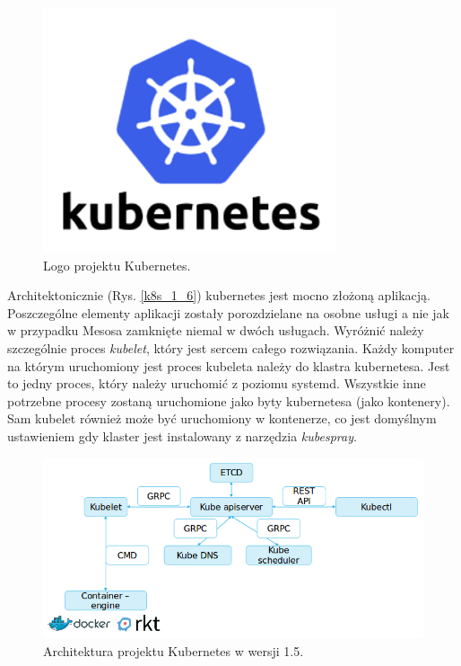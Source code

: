 \documentclass[10pt,a4paper,titlepage,twoside]{report}
\begin{document}
\begin{figure}[!h]
	\centering
	\includegraphics[scale=1]{pics/Kubernetes-logo.png}
	\caption{Logo projektu Kubernetes.}
	\label{kube_logo}
\end{figure}

Architektonicznie (Rys. \ref{k8s_1_6}) kubernetes jest mocno złożoną aplikacją. Poszczególne elementy aplikacji zostały porozdzielane na osobne usługi a nie jak w przypadku Mesosa zamknięte niemal w dwóch usługach. Wyróżnić należy szczególnie proces \textit{kubelet}, który jest sercem całego rozwiązania. Każdy komputer na którym uruchomiony jest proces kubeleta należy do klastra kubernetesa. Jest to jedny proces, który należy uruchomić z poziomu systemd. Wszystkie inne potrzebne procesy zostaną uruchomione jako byty kubernetesa (jako kontenery). Sam kubelet również może być uruchomiony w kontenerze, co jest domyślnym ustawieniem gdy klaster jest instalowany z narzędzia \textit{kubespray}. 

\begin{figure}[!h]
	\centering
	\includegraphics[scale=0.7]{pics/k8s_1_5.png}
	\caption{Architektura projektu Kubernetes w wersji 1.5.}
	\label{k8s_1_5}
\end{figure}
\end{document}
